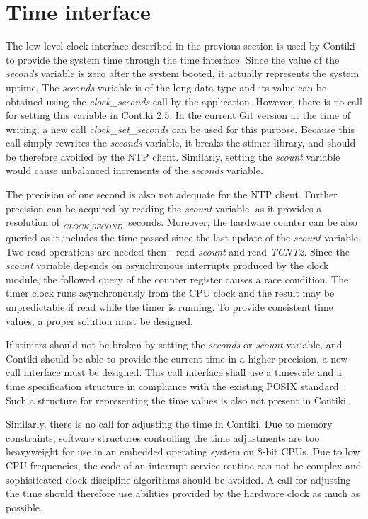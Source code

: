 
\section{Time interface}\label{sec:analysis-time}
The low-level clock interface described in the previous section
is used by Contiki to provide the system time through the time interface.
Since the value of the {\it{seconds}} variable is zero after the system booted,
it actually represents the system uptime.
The {\it{seconds}} variable is of the long data type and its
value can be obtained using the {\it{clock\_seconds}} call by the application.
However, there is no call for setting this variable in Contiki 2.5.
In the current Git version at the time of writing, a new call {\it{clock\_set\_seconds}}
can be used for this purpose.
Because this call simply rewrites the {\it{seconds}} variable, it breaks the stimer library,
and should be therefore avoided by the NTP client.
Similarly, setting the {\it{scount}} variable would cause
unbalanced increments of the {\it{seconds}} variable.

The precision of one second is also not adequate for the NTP client.
Further precision can be acquired by reading the {\it{scount}} variable,
as it provides a resolution of $\frac{1}{CLOCK\_SECOND}$~seconds.
Moreover, the hardware counter can be also queried as it includes the time passed since
the last update of the {\it{scount}} variable.
Two read operations are needed then - read {\it{scount}} and read {\it{TCNT2}}.
Since the {\it{scount}} variable depends on asynchronous interrupts produced by
the clock module, the followed query of the counter register causes a race condition.
The timer clock runs asynchronously from the CPU clock and
the result may be unpredictable if read while the timer is running.
To provide consistent time values, a proper solution must be designed.

If stimers should not be broken by setting the {\it{seconds}} or {\it{scount}} variable,
and Contiki should be able to provide the current time in a higher precision,
a new call interface must be designed.
This call interface shall use a timescale and a time specification structure in compliance
with the existing POSIX standard~\cite{posix}.
Such a structure for representing the time values is also not present in Contiki.

Similarly, there is no call for adjusting the time in Contiki.
Due to memory constraints, software structures controlling the time adjustments are too heavyweight
for use in an embedded operating system on 8-bit CPUs.
Due to low CPU frequencies, the code of an interrupt service routine can not be complex
and sophisticated clock discipline algorithms should be avoided.
A call for adjusting the time should therefore use abilities
provided by the hardware clock as much as possible.

